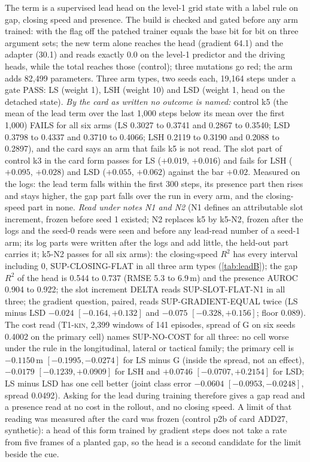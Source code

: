 \documentclass[10pt,twocolumn]{article}
\makeatletter
\theoremstyle{remark}
\newcommand{\tier}[1]{\textsc{\small #1}}
\renewcommand\paragraph{\@startsection{paragraph}{4}{\z@}{1.6ex \@plus .5ex \@minus .2ex}{-1em}{\normalfont\normalsize\bfseries}}
\makeatother
\begin{document}
\paragraph{Asking during training (LEADSUP, card ADD24).} The term is a supervised lead head on the level-1 grid state with a label rule on gap, closing speed and presence. The build is checked and gated before any arm trained: with the flag off the patched trainer equals the base bit for bit on three argument sets; the new term alone reaches the head (gradient 64.1) and the adapter (30.1) and reads exactly 0.0 on the level-1 predictor and the driving heads, while the total reaches those (control); three mutations go red; the arm adds 82,499 parameters. Three arm types, two seeds each, 19,164 steps under a gate PASS: LS (weight 1), LSH (weight 10) and LSD (weight 1, head on the detached state). \emph{By the card as written no outcome is named:} control k5 (the mean of the lead term over the last 1,000 steps below its mean over the first 1,000) FAILS for all six arms (LS 0.3027 to 0.3741 and 0.2867 to 0.3540; LSD 0.3798 to 0.4337 and 0.3710 to 0.4066; LSH 0.2119 to 0.3190 and 0.2088 to 0.2897), and the card says an arm that fails k5 is not read. The slot part of control k3 in the card form passes for LS ($+0.019$, $+0.016$) and fails for LSH ($+0.095$, $+0.028$) and LSD ($+0.055$, $+0.062$) against the bar $+0.02$. Measured on the logs: the lead term falls within the first 300 steps, its presence part then rises and stays higher, the gap part falls over the run in every arm, and the closing-speed part in none. \emph{Read under notes N1 and N2} (N1 defines an attributable slot increment, frozen before seed 1 existed; N2 replaces k5 by k5-N2, frozen after the logs and the seed-0 reads were seen and before any lead-read number of a seed-1 arm; its log parts were written after the logs and add little, the held-out part carries it; k5-N2 passes for all six arms): the closing-speed $R^2$ has every interval including 0, SUP-CLOSING-FLAT in all three arm types (\cref{tab:leadB}); the gap $R^2$ of the head is 0.544 to 0.737 (RMSE 5.3 to 6.9\,m) and the presence AUROC 0.904 to 0.922; the slot increment DELTA reads SUP-SLOT-FLAT-N1 in all three; the gradient question, paired, reads SUP-GRADIENT-EQUAL twice (LS minus LSD $-0.024$ $[-0.164,+0.132]$ and $-0.075$ $[-0.328,+0.156]$; floor 0.089). The cost read (\tier{T1-kin}, 2,399 windows of 141 episodes, spread of G on six seeds 0.4002 on the primary cell) names SUP-NO-COST for all three: no cell worse under the rule in the longitudinal, lateral or tactical family; the primary cell is $-0.1150$\,m $[-0.1995,-0.0274]$ for LS minus G (inside the spread, not an effect), $-0.0179$ $[-0.1239,+0.0909]$ for LSH and $+0.0746$ $[-0.0707,+0.2154]$ for LSD; LS minus LSD has one cell better (joint class error $-0.0604$ $[-0.0953,-0.0248]$, spread 0.0492). Asking for the lead during training therefore gives a gap read and a presence read at no cost in the rollout, and no closing speed. A limit of that reading was measured after the card was frozen (control p2b of card ADD27, synthetic): a head of this form trained by gradient steps does not take a rate from five frames of a planted gap, so the head is a second candidate for the limit beside the cue.
\end{document}
